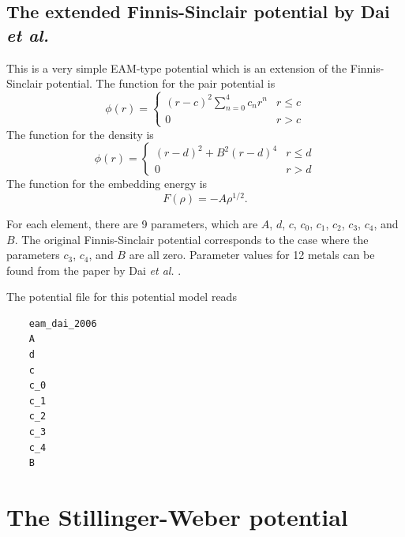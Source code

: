 \documentclass[12pt,a4paper]{report}
\begin{document}
\subsection{The extended Finnis-Sinclair potential by Dai \textit{et al.}}

This is a very simple EAM-type potential which is an extension of the Finnis-Sinclair potential. The function for the pair potential is
\begin{equation}
\phi(r) =
\begin{cases}
(r-c)^2 \sum_{n=0}^4 c_n r^n  & r \leq c \\
0                             & r > c
\end{cases}
\end{equation}
The function for the density is
\begin{equation}
\phi(r) =
\begin{cases}
(r-d)^2 + B^2 (r-d)^4  & r \leq d \\
0                      & r > d
\end{cases}
\end{equation}
The function for the embedding energy is
\begin{equation}
F(\rho) = - A \rho^{1/2}.
\end{equation}

For each element, there are 9 parameters, which are $A$, $d$, $c$, $c_0$, $c_1$, $c_2$, $c_3$, $c_4$, and $B$. The original Finnis-Sinclair potential corresponds to the case where the parameters $c_3$, $c_4$, and $B$ are all zero. Parameter values for 12 metals can be found from the paper by Dai \textit{et al.} \cite{dai2006jpcm}.


The potential file for this potential model reads
\begin{verbatim}
    eam_dai_2006
    A
    d
    c
    c_0
    c_1
    c_2
    c_3
    c_4
    B
\end{verbatim}


\section{The Stillinger-Weber potential}
\end{document}
